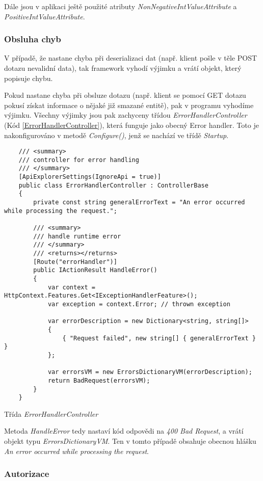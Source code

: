 Dále jsou v aplikaci ještě použité atributy \textit{NonNegativeIntValueAttribute} a \textit{PositiveIntValueAttribute}.


\subsubsection*{Obsluha chyb}

V případě, že nastane chyba při deserializaci dat (např. klient pošle v těle POST dotazu nevalidní data), tak framework vyhodí výjimku a vrátí objekt, který popisuje chybu. \cite{AspNetCoreDocs}

Pokud nastane chyba při obsluze dotazu (např. klient se pomocí GET dotazu pokusí získat informace o nějaké již smazané entitě), pak v programu vyhodíme výjimku. Všechny výjimky jsou pak zachyceny třídou \textit{ErrorHandlerController} (Kód \ref{ErrorHandlerController}), která funguje jako obecný Error handler.
Toto je nakonfigurováno v metodě \textit{Configure()}, jenž se nachází ve třídě \textit{Startup}.

\begin{program}
	\begin{lstlisting}
	/// <summary>
	/// controller for error handling
	/// </summary>
	[ApiExplorerSettings(IgnoreApi = true)]
	public class ErrorHandlerController : ControllerBase
	{
		private const string generalErrorText = "An error occurred while processing the request.";
		
		/// <summary>
		/// handle runtime error
		/// </summary>
		/// <returns></returns>
		[Route("errorHandler")]
		public IActionResult HandleError()
		{
			var context = HttpContext.Features.Get<IExceptionHandlerFeature>();
			var exception = context.Error; // thrown exception
			
			var errorDescription = new Dictionary<string, string[]>
			{
				{ "Request failed", new string[] { generalErrorText } }
			};
			
			var errorsVM = new ErrorsDictionaryVM(errorDescription);
			return BadRequest(errorsVM);
		}
	}
	\end{lstlisting}
	\caption{Třída \textit{ErrorHandlerController}}
	\label{ErrorHandlerController}
\end{program}

Metoda \textit{HandleError} tedy nastaví kód odpovědi na \textit{400 Bad Request}, a vrátí objekt typu \textit{ErrorsDictionaryVM}.
Ten v tomto případě obsahuje obecnou hlášku \textit{An error occurred while processing the request}.

\subsubsection*{Autorizace}

